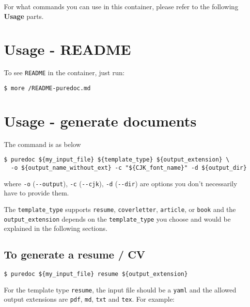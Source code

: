 \documentclass[10pt, a4paper, oneside]{article}
\begin{document}
For what commands you can use in this container, please refer to the following \textbf{Usage} parts.

\section{Usage - README}\label{usage---readme}

To see \texttt{README} in the container, just run:

\begin{verbatim}
$ more /README-puredoc.md
\end{verbatim}

\section{Usage - generate documents}\label{usage---generate-documents}

The command is as below

\begin{verbatim}
$ puredoc ${my_input_file} ${template_type} ${output_extension} \
  -o ${output_name_without_ext} -c "${CJK_font_name}" -d ${output_dir}
\end{verbatim}

where \texttt{-o} (\texttt{-\/-output}), \texttt{-c} (\texttt{-\/-cjk}), \texttt{-d} (\texttt{-\/-dir}) are options you don't necessarily have to provide them.

The \texttt{template\_type} supports \texttt{resume}, \texttt{coverletter}, \texttt{article}, or \texttt{book}
and the \texttt{output\_extension} depends on the \texttt{template\_type} you choose and would be explained in the following sections.

\subsection{To generate a resume / CV}\label{to-generate-a-resume-cv}

\begin{verbatim}
$ puredoc ${my_input_file} resume ${output_extension}
\end{verbatim}

For the template type \texttt{resume},
the input file should be a \texttt{yaml} and
the allowed output extensions are \texttt{pdf}, \texttt{md}, \texttt{txt} and \texttt{tex}.
For example:
\end{document}
